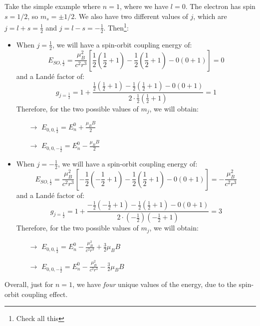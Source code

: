 Take the simple example where $n=1$, where we have $l = 0$. The electron has spin $s=1/2$, so $m_s=\pm 1/2$. We also have two different values of $j$, which are $j = l+s = \frac12$ and $j = l - s = -\frac12$. Then\footnote{\color{red}Check all this}:
\begin{itemize}
    \item When $j=\frac12$, we will have a spin-orbit coupling energy of:
    \begin{equation}
        E_{SO,\frac12} = \frac{\mu_B^2}{c^2r^3}\left[\frac12 \left(\frac12+1\right)-\frac12\left(\frac12+1\right)-0\left(0+1\right)\right] = 0
    \end{equation}
    and a Landé factor of:
    \begin{equation}
        g_{j=\frac12} = 1+\frac{\frac12 \left(\frac12+1\right)-\frac12\left(\frac12+1\right)-0\left(0+1\right)}{2\cdot \frac12 \left(\frac12+1\right)} = 1
    \end{equation}
    Therefore, for the two possible values of $m_j$, we will obtain:
    \begin{itemize}
        \item[$\to$] $E_{0,0,\frac12} = E_n^0+\frac{\mu_B B}{2}$
        \item[$\to$] $E_{0,0,-\frac12} = E_n^0-\frac{\mu_B B}{2}$
    \end{itemize}
    \item When $j=-\frac12$, we will have a spin-orbit coupling energy of:
    \begin{equation}
        E_{SO,\frac12} = \frac{\mu_B^2}{c^2r^3}\left[-\frac12 \left(-\frac12+1\right)-\frac12\left(\frac12+1\right)-0\left(0+1\right)\right] = -\frac{\mu_B^2}{c^2r^3}
    \end{equation}
    and a Landé factor of:
    \begin{equation}
        g_{j=\frac12} = 1+\frac{-\frac12 \left(-\frac12+1\right)-\frac12\left(\frac12+1\right)-0\left(0+1\right)}{2\cdot \left(-\frac12\right) \left(-\frac12+1\right)} = 3
    \end{equation}
    Therefore, for the two possible values of $m_j$, we will obtain:
    \begin{itemize}
        \item[$\to$] $E_{0,0,\frac12} = E_n^0 -\frac{\mu_B^2}{c^2r^3}+\frac{3}{2}\mu_B B$
        \item[$\to$] $E_{0,0,-\frac12} = E_n^0-\frac{\mu_B^2}{c^2r^3}-\frac{3}{2}\mu_B B$
    \end{itemize}
\end{itemize}

Overall, just for $n=1$, we have \textit{four} unique values of the energy, due to the spin-orbit coupling effect.